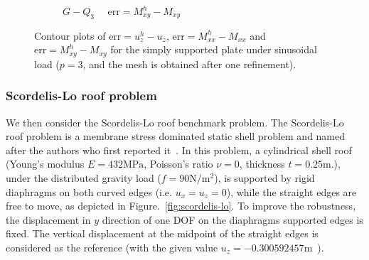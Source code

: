 \begin{figure}[h]
\begin{subfigure}[t]{.45\linewidth}
		\caption{$G-Q_3$ $\quad \text{err} = M_{xy}^h-M_{xy}$}
	\end{subfigure}
	\caption{Contour plots of $\text{err} = u_z^h-u_z$, $\text{err} =  M_{xx}^h- M_{xx}$ and $\text{err} =  M_{xy}^h- M_{xy}$ for the simply supported plate under sinusoidal load ($p=3$, and the mesh is obtained after one refinement). }\label{fig:contour_d_mxx_mxy_plate}
\end{figure}
\FloatBarrier
\subsubsection{Scordelis-Lo roof problem}

We then consider the Scordelis-Lo roof benchmark problem. The Scordelis-Lo roof problem is a membrane stress dominated static shell problem and named after the authors who first reported it~\cite{scordelis1964computer}. In this problem, a cylindrical shell roof (Young's modulus $E=432\text{MPa}$, Poisson's ratio $\nu = 0$, thickness $t = 0.25\text{m}$.), under the distributed gravity load ($f = 90\text{N}/\text{m}^2$), is supported by rigid diaphragms on both curved edges (i.e. $u_{x}=u_z=0$), while the straight edges are free to move, as depicted in Figure.~\ref{fig:scordelis-lo}. To improve the robustness, the displacement in $y$ direction of one DOF on the diaphragms supported edges is fixed. The vertical displacement at the midpoint of the straight edges is considered as the reference (with the given value $u_z=-0.300592457\text{m}$~\cite{coox2017flexible}).\par

